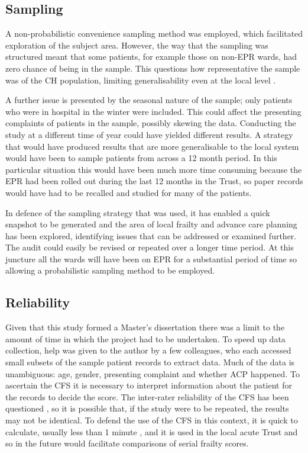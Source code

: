 \documentclass
[
	12pt,
	a4paper,
	oneside,
]{report}
\begin{document}
\subsection{Sampling}
A non-probabilistic convenience sampling method was employed, which facilitated 
exploration of the subject area. However, the way that the sampling was 
structured meant that some patients, for example those on non-EPR wards, had
zero chance of being in the sample. This questions how representative the sample
was of the CH population, limiting generalisability even at the local level 
\parencite{biggam:15}.

A further issue is presented by the seasonal 
nature of the sample; only patients who were in hospital in the winter were 
included. This could affect the presenting complaints of patients in the sample,
possibly skewing the data.
Conducting the study at a different time of year could have yielded different 
results. A strategy that would have produced results that are more generalisable
to the local system would have been to sample patients from across
a 12 month period. In this particular situation this would have been much more
time consuming because the EPR had been rolled out during the last 12 months in
the Trust, so paper records would have had to be recalled and studied for many
of the patients. 

In defence of the sampling strategy that was used, it has enabled a quick 
snapshot to be generated and the area of local frailty and advance care planning
has been explored, identifying issues that can be
addressed or examined further. The audit could easily be revised or repeated 
over a longer time period. At this juncture all the wards 
will have been on EPR for a substantial period of time so
allowing a probabilistic sampling method to be employed.

\subsection{Reliability} 

Given that this study formed a Master's dissertation there was a limit to the
amount of time in which the project had to be undertaken. To speed up data 
collection, help was given to the author by a few
colleagues, who each accessed small subsets of the sample patient records to 
extract data. Much of the data is unambiguous: age, gender, presenting complaint
and whether ACP happened. To ascertain the CFS it is necessary to interpret 
information about the patient for the records to decide the score. The
inter-rater reliability of the CFS has been questioned \parencite{gilbert:18},
so it is possible that, 
if the study were to be repeated, the results may not be identical.
To defend the use of the CFS in this context, it is quick to calculate, usually 
less than 1 minute \parencite{elliott:17}, and it is used in the local acute
Trust and so in the future would facilitate comparisons of serial frailty
scores.
\end{document}
